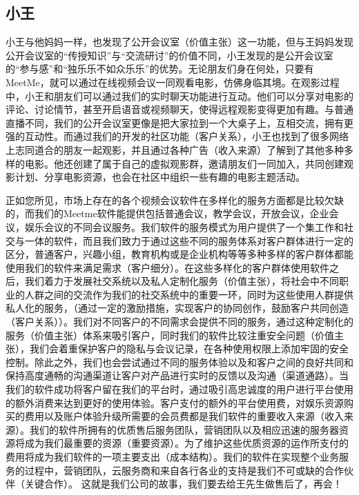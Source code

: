 \documentclass[a4paper,12pt]{article}
\begin{document}
    \subsection{小王}
    \noindent 小王与他妈妈一样，也发现了公开会议室（价值主张）这一功能，但与王妈妈发现公开会议室的“传授知识”与“交流研讨”的价值不同，小王发现的是公开会议室的“参与感”和“独乐乐不如众乐乐”的优势。无论朋友们身在何处，只要有 MeetMe，就可以通过在线视频会议一同观看电影，仿佛身临其境。在观影过程中，小王和朋友们可以通过我们的实时聊天功能进行互动。他们可以分享对电影的评论、讨论情节，甚至开启语音或视频聊天，使得远程观影变得更加有趣。与普通直播不同，我们的公开会议室更像是把大家拉到一个大桌子上，互相交流，拥有更强的互动性。而通过我们的开发的社区功能（客户关系），小王也找到了很多网络上志同道合的朋友一起观影，并且通过各种广告（收入来源）了解到了其他多种多样的电影。他还创建了属于自己的虚拟观影群，邀请朋友们一同加入，共同创建观影计划、分享电影资源，也会在社区中组织一些有趣的电影主题活动。
    
    \vspace{1em}
    
    \noindent 正如您所见，市场上存在的各个视频会议软件在多样化的服务方面都是比较欠缺的，而我们的Meetme软件能提供包括普通会议，教学会议，开放会议，企业会议，娱乐会议的不同会议服务。我们软件的服务模式为用户提供了一个集工作和社交与一体的软件，而且我们致力于通过这些不同的服务体系对客户群体进行一定的区分，普通客户，兴趣小组，教育机构或是企业机构等等多种多样的客户群体都能使用我们的软件来满足需求（客户细分）。在这些多样化的客户群体使用软件之后，我们着力于发展社交系统以及私人定制化服务（价值主张），将社会中不同职业的人群之间的交流作为我们的社交系统中的重要一环，同时为这些使用人群提供私人化的服务，（通过一定的激励措施，实现客户的协同创作，鼓励客户共同创造（客户关系））。我们对不同客户的不同需求会提供不同的服务，通过这种定制化的服务（价值主张）体系来吸引客户，同时我们的软件比较注重安全问题（价值主张），我们会着重保护客户的隐私与会议记录，在各种使用权限上添加牢固的安全控制。除此之外，我们也会尝试通过不同的服务体验以及和客户之间的良好共同和保持高度通畅的沟通渠道让客户对产品进行实时的反馈以及沟通（渠道通路）。当我们的软件成功将客户留在我们的平台时，通过吸引高忠诚度的用户进行平台使用的额外消费来达到更好的使用体验。客户支付的额外的平台使用费，对娱乐资源购买的费用以及账户体验升级所需要的会员费都是我们软件的重要收入来源（收入来源）。我们的软件所拥有的优质售后服务团队，营销团队以及相应迅速的服务器资源将成为我们最重要的资源（重要资源）。为了维护这些优质资源的运作所支付的费用将成为我们软件的一项主要支出（成本结构）。我们的软件在实现整个业务服务的过程中，营销团队，云服务商和来自各行各业的支持是我们不可或缺的合作伙伴（关键合作）。
    这就是我们公司的故事，我们要去给王先生做售后了，再会！
\end{document}
